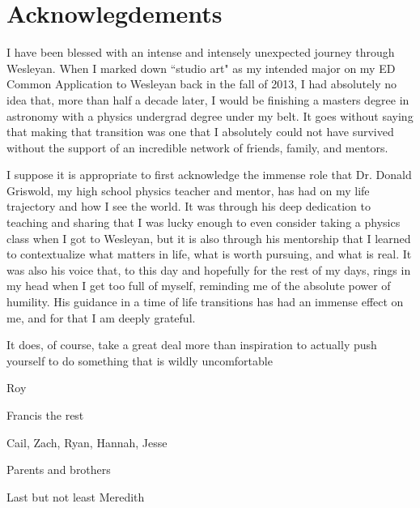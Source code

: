 \chapter{Acknowlegdements}

I have been blessed with an intense and intensely unexpected journey through Wesleyan. When I marked down ``studio art" as my intended major on my ED Common Application to Wesleyan back in the fall of 2013, I had absolutely no idea that, more than half a decade later, I would be finishing a masters degree in astronomy with a physics undergrad degree under my belt. It goes without saying that making that transition was one that I absolutely could not have survived without the support of an incredible network of friends, family, and mentors.

I suppose it is appropriate to first acknowledge the immense role that Dr. Donald Griswold, my high school physics teacher and mentor, has had on my life trajectory and how I see the world. It was through his deep dedication to teaching and sharing that I was lucky enough to even consider taking a physics class when I got to Wesleyan, but it is also through his mentorship that I learned to contextualize what matters in life, what is worth pursuing, and what is real. It was also his voice that, to this day and hopefully for the rest of my days, rings in my head when I get too full of myself, reminding me of the absolute power of humility. His guidance in a time of life transitions has had an immense effect on me, and for that I am deeply grateful.


It does, of course, take a great deal more than inspiration to actually push yourself to do something that is wildly uncomfortable


Roy

Francis the rest

Cail, Zach, Ryan, Hannah, Jesse

Parents and brothers


Last but not least Meredith



